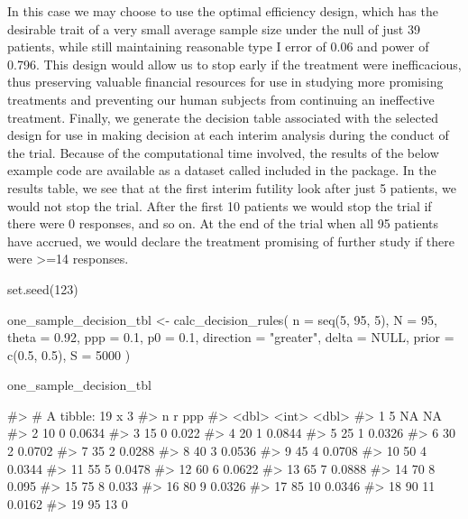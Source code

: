 In this case we may choose to use the optimal efficiency design, which
has the desirable trait of a very small average sample size under the
null of just 39 patients, while still maintaining reasonable type I
error of 0.06 and power of 0.796. This design would allow us to stop
early if the treatment were inefficacious, thus preserving valuable
financial resources for use in studying more promising treatments and
preventing our human subjects from continuing an ineffective treatment.
Finally, we generate the decision table associated with the selected
design for use in making decision at each interim analysis during the
conduct of the trial. Because of the computational time involved, the
results of the below example code are available as a dataset called
 included in the  package.
In the results table, we see that at the first interim futility look
after just 5 patients, we would not stop the trial. After the first 10
patients we would stop the trial if there were 0 responses, and so on.
At the end of the trial when all 95 patients have accrued, we would
declare the treatment promising of further study if there were
\textgreater=14 responses.

\begin{Schunk}
\begin{Sinput}
set.seed(123)

one_sample_decision_tbl <- 
  calc_decision_rules(
    n = seq(5, 95, 5),
    N = 95, 
    theta = 0.92, 
    ppp = 0.1, 
    p0 = 0.1, 
    direction = "greater",
    delta = NULL, 
    prior = c(0.5, 0.5), 
    S = 5000
    )
\end{Sinput}
\end{Schunk}

\begin{Schunk}
\begin{Sinput}
one_sample_decision_tbl
\end{Sinput}
\begin{Soutput}
#> # A tibble: 19 x 3
#>        n     r     ppp
#>    <dbl> <int>   <dbl>
#>  1     5    NA NA     
#>  2    10     0  0.0634
#>  3    15     0  0.022 
#>  4    20     1  0.0844
#>  5    25     1  0.0326
#>  6    30     2  0.0702
#>  7    35     2  0.0288
#>  8    40     3  0.0536
#>  9    45     4  0.0708
#> 10    50     4  0.0344
#> 11    55     5  0.0478
#> 12    60     6  0.0622
#> 13    65     7  0.0888
#> 14    70     8  0.095 
#> 15    75     8  0.033 
#> 16    80     9  0.0326
#> 17    85    10  0.0346
#> 18    90    11  0.0162
#> 19    95    13  0
\end{Soutput}
\end{Schunk}

